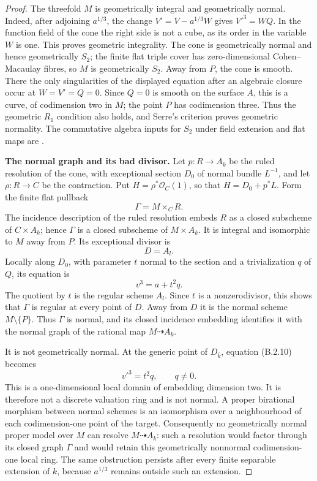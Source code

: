 \begin{proof}
The threefold $M$ is geometrically integral and geometrically
normal.  Indeed, after adjoining $a^{1/3}$, the change
$V'=V-a^{1/3}W$ gives $V'^3=WQ$.  In the function field of the
cone the right side is not a cube, as its order in the variable
$W$ is one.  This proves geometric integrality.
The cone is geometrically normal and hence geometrically $S_2$;
the finite flat triple cover has zero-dimensional
Cohen--Macaulay fibres, so $M$ is geometrically $S_2$.
Away from $P$, the cone is smooth.  There the only singularities
of the displayed equation after an algebraic closure occur at
$W=V'=Q=0$.  Since $Q=0$ is smooth on the surface $A$, this is
a curve, of codimension two in $M$; the point $P$ has codimension
three.  Thus the geometric $R_1$ condition also holds, and
Serre's criterion proves geometric normality.  The commutative
algebra inputs for $S_2$ under field extension and flat maps are
\cite[Tags 045M, 0339 and 031S]{StacksB}.

\par\smallskip\noindent\textbf{The normal graph and its bad divisor.}\quad
Let $p:R\to A_k$ be the ruled resolution of the cone, with
exceptional section $D_0$ of normal bundle $L^{-1}$, and let
$\rho:R\to C$ be the contraction.  Put
$H=\rho^*\mathcal O_C(1)$, so that $H=D_0+p^*L$.
Form the finite flat pullback
\[
                    \Gamma=M\times_C R.
\]
The incidence description of the ruled resolution embeds
$R$ as a closed subscheme of $C\times A_k$; hence $\Gamma$
is a closed subscheme of $M\times A_k$.
It is integral and isomorphic to $M$ away from $P$.
Its exceptional divisor is
\[
                       D=A_l.
\]
Locally along $D_0$, with parameter $t$ normal to the section
and a trivialization $q$ of $Q$, its equation is
\[
                         v^3=a+t^2q.                 \tag{B.2.10}
\]
The quotient by $t$ is the regular scheme $A_l$.
Since $t$ is a nonzerodivisor, this shows that $\Gamma$ is
regular at every point of $D$.  Away from $D$ it is the normal
scheme $M\setminus\{P\}$.  Thus $\Gamma$ is normal, and its
closed incidence embedding identifies it with the normal graph
of the rational map $M\dashrightarrow A_k$.

It is not geometrically normal.  At the generic point of
$D_{\bar k}$, equation (B.2.10) becomes
\[
                    v'^3=t^2q,\qquad q\ne0.
\]
This is a one-dimensional local domain of embedding dimension
two.  It is therefore not a discrete valuation ring and is not
normal.  A proper birational morphism between normal schemes is
an isomorphism over a neighbourhood of each codimension-one
point of the target.  Consequently no geometrically normal
proper model over $M$ can resolve $M\dashrightarrow A_k$:
such a resolution would factor through its closed graph
$\Gamma$ and would retain this geometrically nonnormal
codimension-one local ring.  The same obstruction persists
after every finite separable extension of $k$, because
$a^{1/3}$ remains outside such an extension.


\end{proof}
